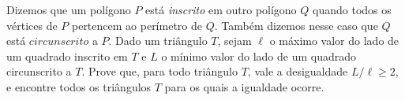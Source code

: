 Dizemos que um polígono $P$ está \textit{inscrito} em outro polígono $Q$ quando todos os vértices de $P$ pertencem ao perímetro de $Q$. Também dizemos nesse caso que $Q$ está $circunscrito$ a $P$. Dado um triângulo $T$, sejam $\ell$ o máximo valor do lado de um quadrado inscrito em $T$ e $L$ o mínimo valor do lado de um quadrado circunscrito a $T$. Prove que, para todo triângulo $T$, vale a desigualdade $L/\ell \ge 2$, e encontre todos os triângulos $T$ para os quais a igualdade ocorre.
